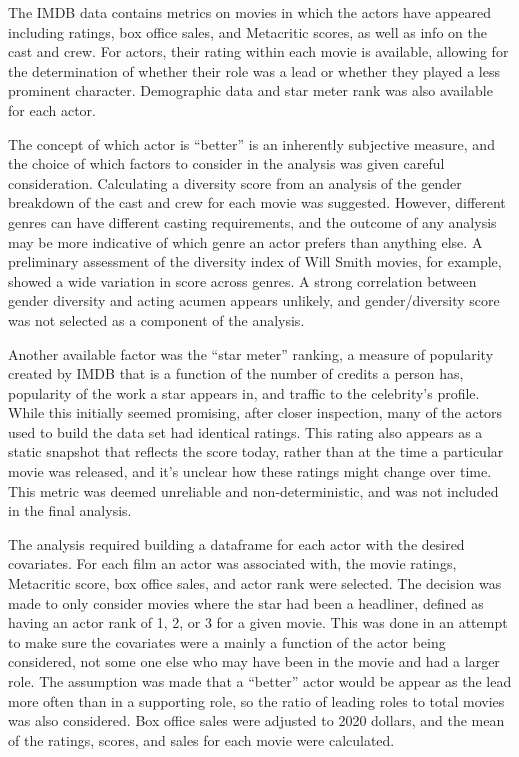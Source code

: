 \documentclass[]{article}
\begin{document}
The IMDB data contains metrics on movies in which the actors have
appeared including ratings, box office sales, and Metacritic scores, as
well as info on the cast and crew. For actors, their rating within each
movie is available, allowing for the determination of whether their role
was a lead or whether they played a less prominent character.
Demographic data and star meter rank was also available for each actor.
\newline

The concept of which actor is ``better'' is an inherently subjective
measure, and the choice of which factors to consider in the analysis was
given careful consideration. Calculating a diversity score from an
analysis of the gender breakdown of the cast and crew for each movie was
suggested. However, different genres can have different casting
requirements, and the outcome of any analysis may be more indicative of
which genre an actor prefers than anything else. A preliminary
assessment of the diversity index of Will Smith movies, for example,
showed a wide variation in score across genres. A strong correlation
between gender diversity and acting acumen appears unlikely, and
gender/diversity score was not selected as a component of the analysis.
\newline

Another available factor was the ``star meter'' ranking, a measure of
popularity created by IMDB that is a function of the number of credits a
person has, popularity of the work a star appears in, and traffic to the
celebrity's profile. While this initially seemed promising, after closer
inspection, many of the actors used to build the data set had identical
ratings. This rating also appears as a static snapshot that reflects the
score today, rather than at the time a particular movie was released,
and it's unclear how these ratings might change over time. This metric
was deemed unreliable and non-deterministic, and was not included in the
final analysis. \newline

The analysis required building a dataframe for each actor with the
desired covariates. For each film an actor was associated with, the
movie ratings, Metacritic score, box office sales, and actor rank were
selected. The decision was made to only consider movies where the star
had been a headliner, defined as having an actor rank of 1, 2, or 3 for
a given movie. This was done in an attempt to make sure the covariates
were a mainly a function of the actor being considered, not some one
else who may have been in the movie and had a larger role. The
assumption was made that a ``better'' actor would be appear as the lead
more often than in a supporting role, so the ratio of leading roles to
total movies was also considered. Box office sales were adjusted to 2020
dollars, and the mean of the ratings, scores, and sales for each movie
were calculated. \newline
\end{document}
